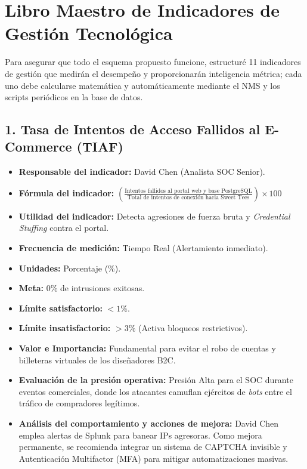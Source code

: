 \documentclass[11pt,a4paper]{article}
\begin{document}
\section{Libro Maestro de Indicadores de Gestión Tecnológica}

Para asegurar que todo el esquema propuesto funcione, estructuré 11 indicadores de gestión que medirán el desempeño y proporcionarán inteligencia métrica; cada uno debe calcularse matemática y automáticamente mediante el NMS y los scripts periódicos en la base de datos.

\subsection{1. Tasa de Intentos de Acceso Fallidos al E-Commerce (TIAF)}
\begin{itemize}[label={--}, itemsep=0.1cm]
    \item \textbf{Responsable del indicador:} David Chen (Analista SOC Senior).
    \item \textbf{Fórmula del indicador:} $\left(\frac{\text{Intentos fallidos al portal web y base PostgreSQL}}{\text{Total de intentos de conexión hacia Sweet Tees}}\right) \times 100$
    \item \textbf{Utilidad del indicador:} Detecta agresiones de fuerza bruta y \textit{Credential Stuffing} contra el portal.
    \item \textbf{Frecuencia de medición:} Tiempo Real (Alertamiento inmediato).
    \item \textbf{Unidades:} Porcentaje (\%).
    \item \textbf{Meta:} $0\%$ de intrusiones exitosas.
    \item \textbf{Límite satisfactorio:} $< 1\%$.
    \item \textbf{Límite insatisfactorio:} $> 3\%$ (Activa bloqueos restrictivos).
    \item \textbf{Valor e Importancia:} Fundamental para evitar el robo de cuentas y billeteras virtuales de los diseñadores B2C.
    \item \textbf{Evaluación de la presión operativa:} Presión Alta para el SOC durante eventos comerciales, donde los atacantes camuflan ejércitos de \textit{bots} entre el tráfico de compradores legítimos.
    \item \textbf{Análisis del comportamiento y acciones de mejora:} David Chen emplea alertas de Splunk para banear IPs agresoras. Como mejora permanente, se recomienda integrar un sistema de CAPTCHA invisible y Autenticación Multifactor (MFA) para mitigar automatizaciones masivas.
\end{itemize}
\end{document}

